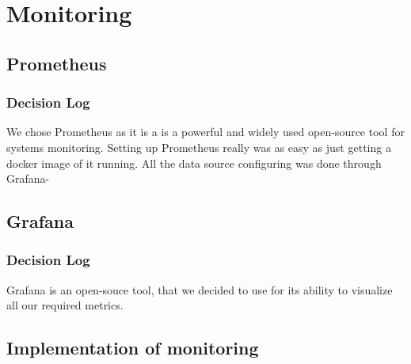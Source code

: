 \section{Monitoring}
\subsection{Prometheus}
\subsubsection{Decision Log}

We chose Prometheus as it is a is a powerful and widely used open-source tool for systems monitoring.
Setting up Prometheus really was as easy as just getting a docker image of it running.
All the data source configuring was done through Grafana-%

\subsection{Grafana}

\subsubsection{Decision Log}

Grafana is an open-souce tool, that we decided to use for its ability to visualize all our required metrics. %


\subsection{Implementation of monitoring}

